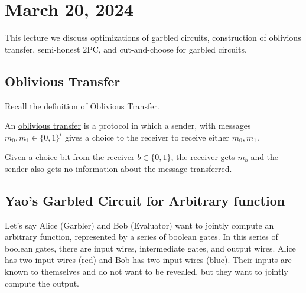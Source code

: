 \section{March 20, 2024}
\label{20240320}

This lecture we discuss optimizations of garbled circuits, construction of oblivious transfer, semi-honest 2PC, and cut-and-choose for garbled circuits.

\subsection{Oblivious Transfer}

Recall the definition of Oblivious Transfer.

\begin{definition}
    An \ul{oblivious transfer} is a protocol in which a sender, with messages $m_0, m_1\in\{0, 1\}^l$ gives a choice to the receiver to receive either $m_0, m_1$.

    Given a choice bit from the receiver $b\in\{0,1\}$, the receiver gets $m_b$ and the sender also gets no information about the message transferred.


\end{definition}

\subsection{Yao's Garbled Circuit for Arbitrary function}

Let's say Alice (Garbler) and Bob (Evaluator) want to jointly compute an arbitrary function, represented by a series of boolean gates. In this series of boolean gates, there are input wires, intermediate gates, and output wires. Alice has two input wires (red) and Bob has two input wires (blue). Their inputs are known to themselves and do not want to be revealed, but they want to jointly compute the output.

